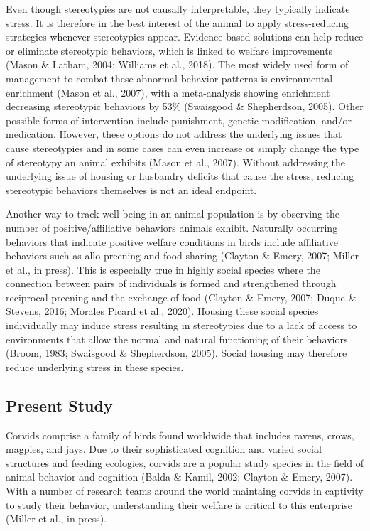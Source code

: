 \documentclass[
  pub]{apa6}
\begin{document}
Even though stereotypies are not causally interpretable, they typically indicate stress. It is therefore in the best interest of the animal to apply stress-reducing strategies whenever stereotypies appear. Evidence-based solutions can help reduce or eliminate stereotypic behaviors, which is linked to welfare improvements (Mason \& Latham, 2004; Williams et al., 2018). The most widely used form of management to combat these abnormal behavior patterns is environmental enrichment (Mason et al., 2007), with a meta-analysis showing enrichment decreasing stereotypic behaviors by 53\% (Swaisgood \& Shepherdson, 2005). Other possible forms of intervention include punishment, genetic modification, and/or medication. However, these options do not address the underlying issues that cause stereotypies and in some cases can even increase or simply change the type of stereotypy an animal exhibits (Mason et al., 2007). Without addressing the underlying issue of housing or husbandry deficits that cause the stress, reducing stereotypic behaviors themselves is not an ideal endpoint.

Another way to track well-being in an animal population is by observing the number of positive/affiliative behaviors animals exhibit. Naturally occurring behaviors that indicate positive welfare conditions in birds include affiliative behaviors such as allo-preening and food sharing (Clayton \& Emery, 2007; Miller et al., in press). This is especially true in highly social species where the connection between pairs of individuals is formed and strengthened through reciprocal preening and the exchange of food (Clayton \& Emery, 2007; Duque \& Stevens, 2016; Morales Picard et al., 2020). Housing these social species individually may induce stress resulting in stereotypies due to a lack of access to environments that allow the normal and natural functioning of their behaviors (Broom, 1983; Swaisgood \& Shepherdson, 2005). Social housing may therefore reduce underlying stress in these species.

\hypertarget{present-study}{%
\subsection{Present Study}\label{present-study}}

Corvids comprise a family of birds found worldwide that includes ravens, crows, magpies, and jays. Due to their sophisticated cognition and varied social structures and feeding ecologies, corvids are a popular study species in the field of animal behavior and cognition (Balda \& Kamil, 2002; Clayton \& Emery, 2007). With a number of research teams around the world maintaing corvids in captivity to study their behavior, understanding their welfare is critical to this enterprise (Miller et al., in press).
\end{document}
